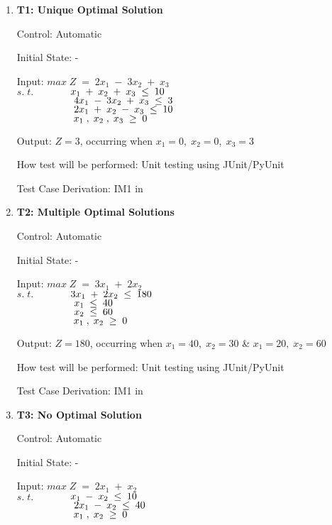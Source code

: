 \documentclass[12pt, titlepage]{article}
\begin{document}
\begin{enumerate}
	\item{\textbf{T1: Unique Optimal Solution}}
	
	Control: Automatic 
	
	Initial State: -
	
	Input: $max\;Z\;=\;2x_1\;-\;3x_2\;+\;x_3$\\
	$s.\;t.$$\hspace*{1.3cm} x_1\;+\;x_2\;+\;x_3\; \leq \;10$\\
	$\hspace*{2cm} 4x_1\;-\;3x_2\;+\;x_3\; \leq \;3$\\
	$\hspace*{2cm} 2x_1\;+\;x_2\;-\;x_3\; \leq \;10$\\
	$\hspace*{2cm} x_1\;,\;x_2\;,\;x_3\; \geq \;0$
	
	Output: $Z = 3$, occurring when $x_1=0,\;x_2=0,\;x_3=3$
	
	How test will be performed: Unit testing using JUnit/PyUnit
	
	Test Case Derivation: IM1 in \cite{losms-ca}

	\item{\textbf{T2: Multiple Optimal Solutions}}
	
	Control: Automatic 
	
	Initial State: -
	
	Input: $max\;Z\;=\;3x_1\;+\;2x_2$\\
	$s.\;t.$$\hspace*{1.3cm} 3x_1\;+\;2x_2\; \leq \;180$\\
	$\hspace*{2cm} x_1\; \leq \;40$\\
	$\hspace*{2cm} x_2\; \leq \;60$\\
	$\hspace*{2cm} x_1\;,\;x_2\; \geq \;0$
	
	Output: $Z = 180$, occurring when $x_1=40,\;x_2=30$ \& $x_1=20,\;x_2=60$
	
	How test will be performed: Unit testing using JUnit/PyUnit
	
	Test Case Derivation: IM1 in \cite{losms-ca}

	\item{\textbf{T3: No Optimal Solution}}
	
	Control: Automatic 
	
	Initial State: -
	
	Input: $max\;Z\;=\;2x_1\;+\;x_2$\\
	$s.\;t.$$\hspace*{1.3cm} x_1\;-\;x_2\; \leq \;10$\\
	$\hspace*{2cm} 2x_1\;-\;x_2\; \leq \;40$\\
	$\hspace*{2cm} x_1\;,\;x_2\; \geq \;0$
	

\end{enumerate}
\end{document}
